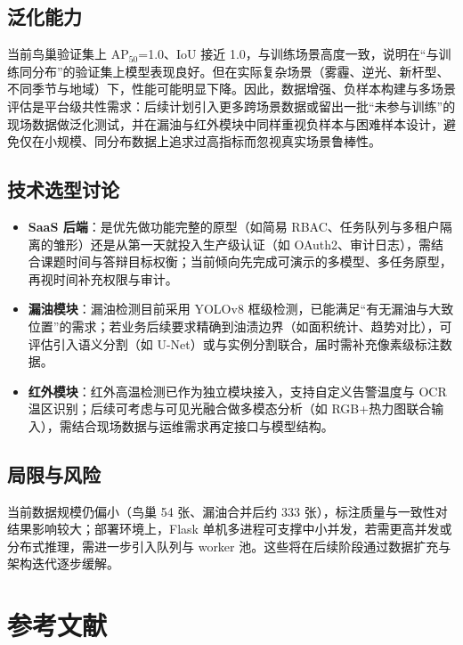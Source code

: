 \documentclass[12pt,a4paper]{article}
\begin{document}
\subsection{泛化能力}

当前鸟巢验证集上 AP$_{50}$=1.0、IoU 接近 1.0，与训练场景高度一致，说明在“与训练同分布”的验证集上模型表现良好。但在实际复杂场景（雾霾、逆光、新杆型、不同季节与地域）下，性能可能明显下降。因此，数据增强、负样本构建与多场景评估是平台级共性需求：后续计划引入更多跨场景数据或留出一批“未参与训练”的现场数据做泛化测试，并在漏油与红外模块中同样重视负样本与困难样本设计，避免仅在小规模、同分布数据上追求过高指标而忽视真实场景鲁棒性。

\subsection{技术选型讨论}

\begin{itemize}
  \item \textbf{SaaS 后端}：是优先做功能完整的原型（如简易 RBAC、任务队列与多租户隔离的雏形）还是从第一天就投入生产级认证（如 OAuth2、审计日志），需结合课题时间与答辩目标权衡；当前倾向先完成可演示的多模型、多任务原型，再视时间补充权限与审计。
  \item \textbf{漏油模块}：漏油检测目前采用 YOLOv8 框级检测，已能满足“有无漏油与大致位置”的需求；若业务后续要求精确到油渍边界（如面积统计、趋势对比），可评估引入语义分割（如 U-Net）或与实例分割联合，届时需补充像素级标注数据。
  \item \textbf{红外模块}：红外高温检测已作为独立模块接入，支持自定义告警温度与 OCR 温区识别；后续可考虑与可见光融合做多模态分析（如 RGB+热力图联合输入），需结合现场数据与运维需求再定接口与模型结构。
\end{itemize}

\subsection{局限与风险}

当前数据规模仍偏小（鸟巢 54 张、漏油合并后约 333 张），标注质量与一致性对结果影响较大；部署环境上，Flask 单机多进程可支撑中小并发，若需更高并发或分布式推理，需进一步引入队列与 worker 池。这些将在后续阶段通过数据扩充与架构迭代逐步缓解。

\section{参考文献}
\end{document}
